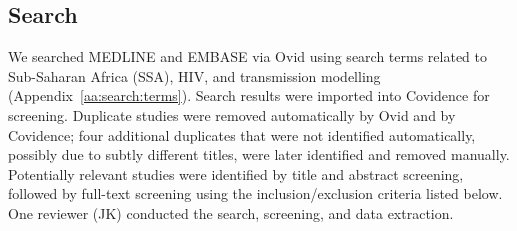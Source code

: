 \subsection{Search}
\label{ss:meth:search}
We searched MEDLINE and EMBASE via Ovid
using search terms related to Sub-Saharan Africa (SSA), HIV, and transmission modelling
(Appendix~\ref{aa:search:terms}).
Search results were imported into Covidence \cite{Covidence} for screening.
Duplicate studies were removed automatically by Ovid and by Covidence;
four additional duplicates that were not identified automatically,
possibly due to subtly different titles, were later identified and removed manually.
Potentially relevant studies were identified by title and abstract screening, followed 
by full-text screening using the inclusion/exclusion criteria listed below. 
One reviewer (JK) conducted the search, screening, and data extraction.
